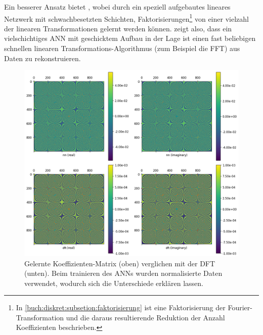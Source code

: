 Ein besserer Ansatz bietet \cite{ml:pmlr-v97-dao19a}, wobei durch ein speziell aufgebautes
lineares Netzwerk mit schwachbesetzten Schichten, Faktorisierungen\footnote{In
\ref{buch:diskret:subsetion:faktorisierung} ist eine Faktorisierung der
Fourier-Transformation und die daraus resultierende Reduktion der Anzahl Koeffizienten
beschrieben.} von einer vielzahl der linearen Transformationen gelernt werden können.
\cite{ml:pmlr-v97-dao19a} zeigt also, dass ein vielschichtiges ANN mit geschicktem Aufbau in der Lage ist
einen fast beliebigen schnellen linearen Transformations-Algorithmus (zum Beispiel die FFT)
aus Daten zu rekonstruieren.

\begin{figure}
    \centering
    \includegraphics[width=\textwidth]{papers/ml/images/learned_coeff_vs_dft.png}
    \caption{Gelernte Koeffizienten-Matrix (oben) verglichen mit der DFT (unten).
    Beim trainieren des ANNs wurden normalisierte Daten verwendet, wodurch sich die
    Unterschiede erklären lassen.}
    \label{fig:ml:dft-with-ann:leanred-vs-dft}
\end{figure}